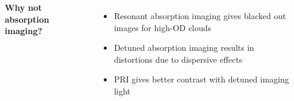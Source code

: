 \documentclass[26pt, paperwidth=36in,paperheight=48in]{tikzposter} %
\newcommand{\myfont}{\fontsize{26}{36}\selectfont}
\begin{document}
\begin{columns}
{\begin{minipage}{0.15\textwidth}
		\\
	\end{minipage}
	
	\vspace{2.0cm}
	
	\begin{minipage}{0.28\textwidth}
		\flushleft
		\vspace{0.5cm}
		\textbf{Why not absorption imaging?}
		\vspace{0.5cm}
		\myfont
		\begin{minipage}{0.75\textwidth}
			\flushleft
			\vspace{1.0cm}
			\begin{itemize}				
				\item Resonant absorption imaging gives blacked out images for high-OD clouds
				
				\item Detuned absorption imaging results in distortions due to dispersive effects
				
				\item PRI gives better contrast with detuned imaging light
				

\end{itemize}
\end{minipage}
\end{minipage}}
\end{columns}
\end{document}
